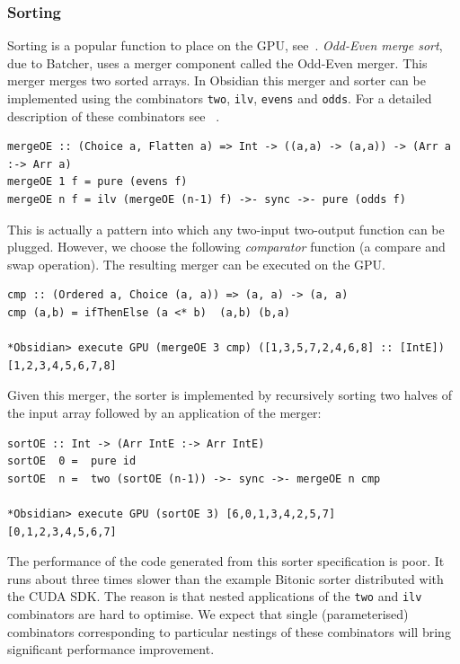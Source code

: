 \subsubsection{Sorting}

Sorting is a popular function to place on the GPU, see~\cite{SINTORNSORT,SORT3}.
{\em Odd-Even merge sort}, due to Batcher, uses a merger component called the Odd-Even merger. This 
merger merges two sorted arrays. In Obsidian this merger and sorter 
can be implemented using the combinators {\tt two}, {\tt ilv}, {\tt evens}
and {\tt odds}. For a detailed description of these combinators see
~\cite{LAVASORTER}.

\begin{small}
\begin{verbatim}
mergeOE :: (Choice a, Flatten a) => Int -> ((a,a) -> (a,a)) -> (Arr a :-> Arr a)
mergeOE 1 f = pure (evens f)
mergeOE n f = ilv (mergeOE (n-1) f) ->- sync ->- pure (odds f)
\end{verbatim}
\end{small}
\noindent
This is actually a pattern into which any two-input two-output function
can be plugged. However, we choose the following {\em comparator} function (a compare and swap operation). The resulting merger can be executed on the GPU.
\begin{small}
\begin{verbatim}
cmp :: (Ordered a, Choice (a, a)) => (a, a) -> (a, a)
cmp (a,b) = ifThenElse (a <* b)  (a,b) (b,a)

*Obsidian> execute GPU (mergeOE 3 cmp) ([1,3,5,7,2,4,6,8] :: [IntE]) 
[1,2,3,4,5,6,7,8]
\end{verbatim}
\end{small}
\noindent
Given this merger, the sorter is implemented by recursively sorting 
two halves of the input array followed by an application of the merger:

\begin{small}
\begin{verbatim}
sortOE :: Int -> (Arr IntE :-> Arr IntE)
sortOE  0 =  pure id
sortOE  n =  two (sortOE (n-1)) ->- sync ->- mergeOE n cmp 

*Obsidian> execute GPU (sortOE 3) [6,0,1,3,4,2,5,7]
[0,1,2,3,4,5,6,7]
\end{verbatim}
\end{small}

The performance of the code generated from this sorter specification is poor. It
runs about three times slower than the example Bitonic
sorter distributed with the CUDA SDK. 
The reason is that nested applications of the {\tt two} and {\tt ilv} 
combinators are hard to optimise. We expect that single (parameterised) combinators corresponding
to particular nestings of these combinators will bring significant performance improvement.
%


